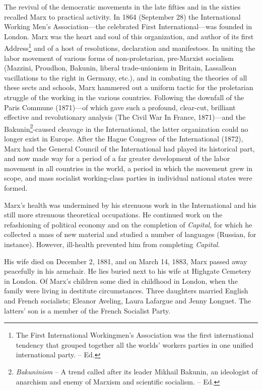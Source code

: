 \documentclass[a4paper,12pt]{book}
\begin{document}
The revival of the democratic movements in the late fifties and in the sixties recalled Marx to practical activity. In 1864 (September 28) the International Working Men’s Association—the celebrated First International—was founded in London. Marx was the heart and soul of this organization, and author of its first Address\footnote{The First International Workingmen’s Association was the first international tendency that grouped together all the worlds’ workers parties in one unified international party. -- Ed.} and of a host of resolutions, declaration and manifestoes. In uniting the labor movement of various forms of non-proletarian, pre-Marxist socialism (Mazzini, Proudhon, Bakunin, liberal trade-unionism in Britain, Lassallean vacillations to the right in Germany, etc.), and in combating the theories of all these sects and schools, Marx hammered out a uniform tactic for the proletarian struggle of the working in the various countries. Following the downfall of the Paris Commune (1871)—of which gave such a profound, clear-cut, brilliant effective and revolutionary analysis (The Civil War In France, 1871)—and the Bakunin\footnote{\emph{Bakuninism} -- A trend called after its leader Mikhail Bakunin, an ideologist of anarchism and enemy of Marxism and scientific socialism. -- Ed. }-caused cleavage in the International, the latter organization could no longer exist in Europe. After the Hague Congress of the International (1872), Marx had the General Council of the International had played its historical part, and now made way for a period of a far greater development of the labor movement in all countries in the world, a period in which the movement grew in scope, and mass socialist working-class parties in individual national states were formed.

Marx’s health was undermined by his strenuous work in the International and his still more strenuous theoretical occupations. He continued work on the refashioning of political economy and on the completion of \emph{Capital}, for which he collected a mass of new material and studied a number of languages (Russian, for instance). However, ill-health prevented him from completing \emph{Capital}.

His wife died on December 2, 1881, and on March 14, 1883, Marx passed away peacefully in his armchair. He lies buried next to his wife at Highgate Cemetery in London. Of Marx’s children some died in childhood in London, when the family were living in destitute circumstances. Three daughters married English and French socialists; Eleanor Aveling, Laura Lafargue and Jenny Longuet. The latters’ son is a member of the French Socialist Party. 
\end{document}
